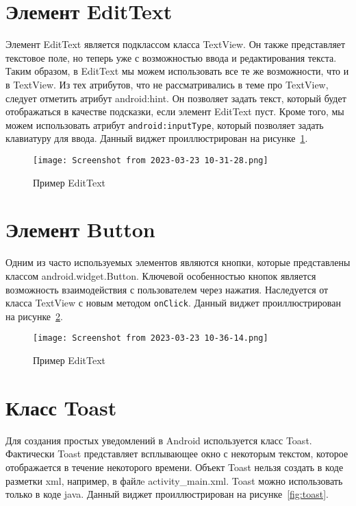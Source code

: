 \section{Элемент EditText}
Элемент EditText является подклассом класса TextView. Он также 
представляет текстовое поле, но теперь уже с возможностью ввода и 
редактирования текста. Таким образом, в EditText мы можем использовать 
все те же возможности, что и в TextView. Из тех атрибутов, что не 
рассматривались в теме про TextView, следует отметить атрибут android:hint. 
Он позволяет задать текст, который будет отображаться в качестве 
подсказки, если элемент EditText пуст. Кроме того, мы можем использовать 
атрибут \texttt{android:inputType}, который позволяет задать
клавиатуру для ввода.
Данный виджет проиллюстрирован на рисунке~\ref{fig:edittext}.

\begin{figure}[h!tp]
	\centering
	\texttt{[image: Screenshot from 2023-03-23 10-31-28.png]}
	\caption{Пример EditText}
	\label{fig:edittext}
\end{figure}

\section{Элемент Button}
Одним из часто используемых элементов являются кнопки, которые 
представлены классом android.widget.Button. Ключевой особенностью кнопок 
является возможность взаимодействия с пользователем через нажатия. 
Наследуется от класса TextView с новым методом \texttt{onClick}.
Данный виджет проиллюстрирован на рисунке~\ref{fig:button}.

\begin{figure}[h!tp]
	\centering
	\texttt{[image: Screenshot from 2023-03-23 10-36-14.png]}
	\caption{Пример EditText}
	\label{fig:button}
\end{figure}

\section{Класс Toast}
Для создания простых уведомлений в Android используется класс 
Toast. Фактически Toast представляет всплывающее окно с некоторым 
текстом, которое отображается в течение некоторого времени. Объект Toast 
нельзя создать в коде разметки xml, например, в файлe activity\_main.xml. 
Toast можно использовать только в коде java.
Данный виджет проиллюстрирован на рисунке~\ref{fig:toast}.

